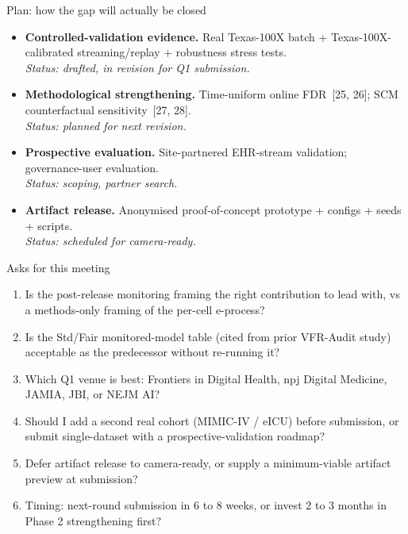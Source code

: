 \documentclass[aspectratio=169,11pt]{beamer}
\newcommand{\chip}[2][amber]{%
  \begingroup\setlength{\fboxsep}{4pt}%
  \colorbox{#1}{\color{ink}\bfseries\small #2}\endgroup}
\begin{document}
\begin{frame}{Plan: how the gap will actually be closed}
\small
\begin{itemize}\setlength\itemsep{4pt}
\item[{\chip[amber]{Phase 1}}] \textbf{Controlled-validation evidence.} Real Texas-100X batch + Texas-100X-calibrated streaming/replay + robustness stress tests.\\
  \textcolor{muted}{\itshape Status: drafted, in revision for Q1 submission.}
\item[{\chip[amber]{Phase 2}}] \textbf{Methodological strengthening.} Time-uniform online FDR~[25, 26]; SCM counterfactual sensitivity~[27, 28].\\
  \textcolor{muted}{\itshape Status: planned for next revision.}
\item[{\chip[amber]{Phase 3}}] \textbf{Prospective evaluation.} Site-partnered EHR-stream validation; governance-user evaluation.\\
  \textcolor{muted}{\itshape Status: scoping, partner search.}
\item[{\chip[amber]{Phase 4}}] \textbf{Artifact release.} Anonymised proof-of-concept prototype + configs + seeds + scripts.\\
  \textcolor{muted}{\itshape Status: scheduled for camera-ready.}
\end{itemize}
\end{frame}

\begin{frame}{Asks for this meeting}
\small
\begin{enumerate}\setlength\itemsep{3pt}
\item Is the post-release monitoring framing the right contribution to lead with, vs a methods-only framing of the per-cell e-process?
\item Is the Std/Fair monitored-model table (cited from prior VFR-Audit study) acceptable as the predecessor without re-running it?
\item Which Q1 venue is best: Frontiers in Digital Health, npj Digital Medicine, JAMIA, JBI, or NEJM AI?
\item Should I add a second real cohort (MIMIC-IV / eICU) before submission, or submit single-dataset with a prospective-validation roadmap?
\item Defer artifact release to camera-ready, or supply a minimum-viable artifact preview at submission?
\item Timing: next-round submission in 6 to 8 weeks, or invest 2 to 3 months in Phase 2 strengthening first?
\end{enumerate}
\end{frame}
\end{document}
